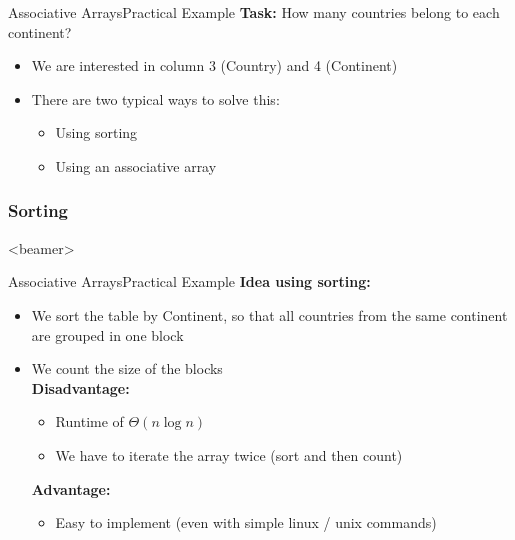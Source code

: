 \begin{frame}{Associative Arrays}{Practical Example}
  \textbf{Task:}
  How many countries belong to each continent?
  \begin{itemize}
    \item
      We are interested in column 3 (Country) and 4 (Continent)
    \item
      There are two typical ways to solve this:
      \begin{itemize}
        \item
          Using sorting
        \item
          Using an associative array
      \end{itemize}
  \end{itemize}
\end{frame}


\subsubsection{Sorting}

\begin{frame}<beamer>{\LectureToC}
\end{frame}

\begin{frame}{Associative Arrays}{Practical Example}
  \textbf{Idea using sorting:}
  \begin{itemize}
    \item
      We sort the table by Continent, so that all countries
      from the same continent are grouped in one block
    \item
      We count the size of the blocks\\[0.5em]
      \textbf{Disadvantage:}
      \begin{itemize}
        \item
          Runtime of $\Theta (n \log n)$
        \item
          We have to iterate the array twice (sort and then count)
      \end{itemize}
      \textbf{Advantage:}
      \begin{itemize}
        \item
          Easy to implement (even with simple linux / unix commands)
      \end{itemize}
  \end{itemize}
\end{frame}

